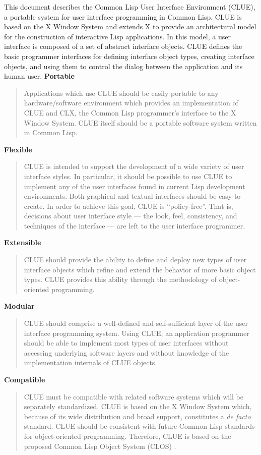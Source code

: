 %
This document describes the Common Lisp User Interface Environment (CLUE), a
portable system for user interface programming in Common Lisp.
CLUE is based on the X Window System\cite{x-window-system} and extends X to
provide an architectural model for the construction of interactive
Lisp applications.
In this model, a user interface is composed of a set of abstract interface
objects.  CLUE defines the basic programmer interfaces for defining
interface object types, creating interface
objects, and using them to control the dialog between the application and its
human user.  
%
{\bf Portable}
\begin{quote}
Applications which use CLUE should be easily portable to any hardware/software
environment which provides an implementation of CLUE and CLX\cite{clx},
the Common Lisp programmer's interface to the X Window System.  CLUE
itself should be a portable software system written in Common Lisp\cite{cltl}.
\end{quote}
%
{\bf Flexible}
\begin{quote}
CLUE is intended to support the development of a wide variety of user interface
styles. In particular, it should be possible to use CLUE to implement any of the
user interfaces found in current Lisp development environments. Both
graphical and textual interfaces should be easy to create. In order to achieve
this goal, CLUE is
``policy-free''. That is, decisions about user interface style --- the look,
feel, consistency, and techniques of the interface --- are left to the user
interface programmer.
\end{quote}
%
{\bf Extensible}
\begin{quote}
CLUE should provide the ability to define and deploy new types of user
interface objects which refine and extend the behavior of more basic
object types. CLUE provides this ability through the methodology
of object-oriented programming.  
\end{quote} 
%
{\bf Modular}
\begin{quote}
CLUE should comprise a well-defined and self-sufficient layer of the
user interface programming system. Using
CLUE, an
application programmer should be able to implement most types of user
interfaces without accessing underlying software layers and without knowledge of the
implementation internals of CLUE objects.
\end{quote} {\bf Compatible}
\begin{quote}
CLUE must be compatible with related software systems which will be
separately standardized. 
CLUE is based on the X Window System
 which,
because of its wide distribution and broad support, constitutes a {\it de facto}
standard\footnotemark.
CLUE should be consistent with future Common Lisp standards for object-oriented programming.
Therefore, CLUE is based on the proposed Common Lisp Object System
(CLOS)
\cite{clos}.
\end{quote}
